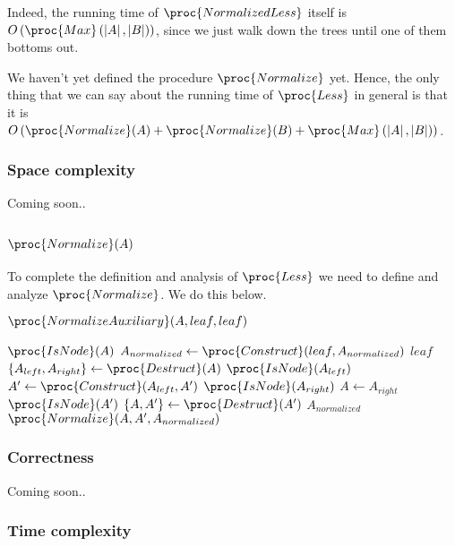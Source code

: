 Indeed, the running time of $\proc{NormalizedLess}$ itself is
$O\left(\proc{Max}\left(\left|A\right|,\left|B\right|\right)\right)$, since we
just walk down the trees until one of them bottoms out. 

We haven't yet defined the procedure $\proc{Normalize}$ yet. Hence, the only
thing that we can say about the running time of $\proc{Less}$ in general is
that it is $O\left(\proc{Normalize}(A) + \proc{Normalize}(B) +
\proc{Max}\left(\left|A\right|,\left|B\right|\right) \right)$.

\subsubsection{Space complexity}

Coming soon..

\subsection{$\proc{Normalize}(A)$}

To complete the definition and analysis of $\proc{Less}$ we need to define and
analyze $\proc{Normalize}$. We do this below.

\begin{codebox}
\li $\proc{NormalizeAuxiliary}(A,leaf,leaf)$
\end{codebox}

\begin{codebox}
\li \If $\proc{IsNode}(A)$ \Then
\li   $A_{normalized}\gets \proc{Construct}(leaf,A_{normalized})$
\li \Else
\li   \Return $leaf$
    \End
\zi
\li $\{A_{left}, A_{right}\} \gets \proc{Destruct}(A)$
\li \If $\proc{IsNode}(A_{left})$ \Then
\li   $A'\gets \proc{Construct}(A_{left}, A')$
    \End
\li \If $\proc{IsNode}(A_{right})$ \Then
\li   $A \gets A_{right}$
\li \Else
\li   \If $\proc{IsNode}(A')$ \Then
\li     $\{A,A'\} \gets \proc{Destruct}(A')$
\li   \Else
\li     \Return $A_{normalized}$
      \End
    \End
\li \Return $\proc{Normalize}(A,A',A_{normalized})$
\end{codebox}

\subsubsection{Correctness}

Coming soon..

\subsubsection{Time complexity}

